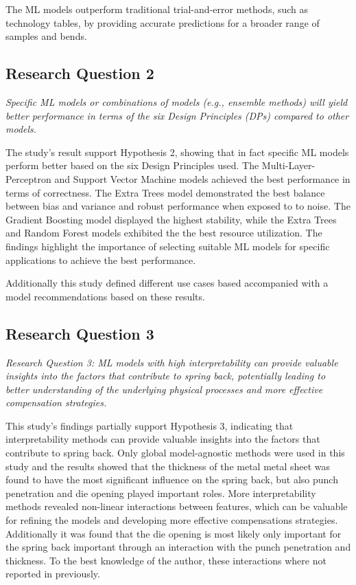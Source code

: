 The \ac{ML} models outperform traditional trial-and-error methods, such as technology tables, by providing accurate
predictions for a broader range of samples and bends.

\subsection{Research Question 2}
\label{subsec:research-question-2:-which-ml-models-or-combinations-of-models-yield-the-best-performance?}
\textit{Specific ML models or combinations of models (e.g., ensemble methods) will yield better
performance in terms of the six Design Principles (DPs) compared to other models.}

The study's result support Hypothesis 2, showing that in fact specific \ac{ML} models perform better based on the six
Design
Principles used.
The Multi-Layer-Perceptron and Support Vector Machine models achieved the best performance in terms of correctness.
The Extra Trees model demonstrated the best balance between bias and variance and robust performance when exposed to
to noise.
The Gradient Boosting model displayed the highest stability, while the Extra Trees and Random Forest models exhibited
the the best resource utilization.
The findings highlight the importance of selecting suitable \ac{ML} models for specific applications to achieve the
best performance.

Additionally this study defined different use cases based accompanied with a model recommendations based on these
results.

\subsection{Research Question 3}
\label{subsec:research-question-3:-can-ml-models-with-high-interpretability-provide
-valuable-insights-into-the-factors-
contributing-to-spring-back?}
\textit{Research Question 3: ML models with high interpretability can provide valuable insights into the factors that
contribute to spring back, potentially leading to better understanding of the underlying physical processes and
more effective compensation strategies.}

This study's findings partially support Hypothesis 3, indicating that interpretability methods can provide valuable
insights into the factors that contribute to spring back.
Only global model-agnostic methods were used in this study and the results showed that the thickness of the metal
metal sheet was found to have the most significant influence on the spring back, but also punch
penetration and die opening played important roles.
More interpretability methods revealed non-linear interactions between features, which can
be valuable for refining the models and developing more effective compensations strategies.
Additionally it was found that the die opening is most likely only important for the spring back important through an
interaction with the punch penetration and thickness.
To the best knowledge of the author, these interactions where not reported in previously.


